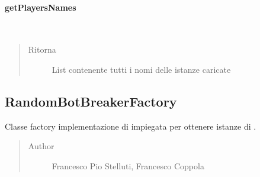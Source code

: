 \documentclass[letterpaper,10pt,italian,openany,oneside]{sphinxmanual}
\begin{document}
\paragraph{getPlayersNames}
\label{\detokenize{source/it/unicam/cs/pa/mastermind/factories/PlayerFactoryRegistry:getplayersnames}}

\begin{fulllineitems}
\label{\detokenize{source/it/unicam/cs/pa/mastermind/factories/PlayerFactoryRegistry:it.unicam.cs.pa.mastermind.factories.PlayerFactoryRegistry.getPlayersNames()}}~\begin{quote}\begin{description}
\item[{Ritorna}] \leavevmode
List contenente tutti i nomi delle istanze  caricate

\end{description}\end{quote}

\end{fulllineitems}



\subsection{RandomBotBreakerFactory}
\label{\detokenize{source/it/unicam/cs/pa/mastermind/factories/RandomBotBreakerFactory:randombotbreakerfactory}}\label{\detokenize{source/it/unicam/cs/pa/mastermind/factories/RandomBotBreakerFactory::doc}}

\begin{fulllineitems}
\label{\detokenize{source/it/unicam/cs/pa/mastermind/factories/RandomBotBreakerFactory:it.unicam.cs.pa.mastermind.factories.RandomBotBreakerFactory}}
Classe factory implementazione di  impiegata per ottenere istanze di .
\begin{quote}\begin{description}
\item[{Author}] \leavevmode
Francesco Pio Stelluti, Francesco Coppola

\end{description}\end{quote}

\end{fulllineitems}
\end{document}
